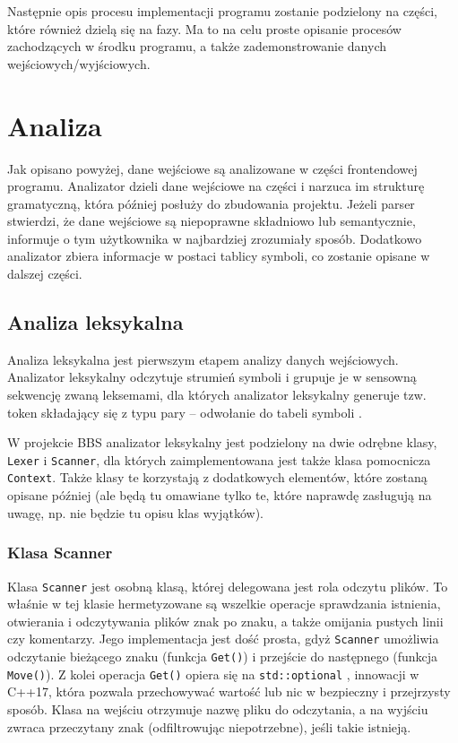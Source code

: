Następnie opis procesu implementacji programu zostanie podzielony na części, które również dzielą się na fazy. Ma to na celu proste opisanie procesów zachodzących w środku programu, a także zademonstrowanie danych wejściowych/wyjściowych.

\section{Analiza}
Jak opisano powyżej, dane wejściowe są analizowane w części frontendowej programu. Analizator dzieli dane wejściowe na części i narzuca im strukturę gramatyczną, która później posłuży do zbudowania projektu. Jeżeli parser stwierdzi, że dane wejściowe są niepoprawne składniowo lub semantycznie, informuje o tym użytkownika w najbardziej zrozumiały sposób. Dodatkowo analizator zbiera informacje w postaci tablicy symboli, co zostanie opisane w dalszej części.

\subsection{Analiza leksykalna}
Analiza leksykalna jest pierwszym etapem analizy danych wejściowych. Analizator leksykalny odczytuje strumień symboli i grupuje je w sensowną sekwencję zwaną leksemami, dla których analizator leksykalny generuje tzw. token składający się z typu pary -- odwołanie do tabeli symboli \cite{compilers}.

W projekcie BBS analizator leksykalny jest podzielony na dwie odrębne klasy, \texttt{Lexer} i \texttt{Scanner}, dla których zaimplementowana jest także klasa pomocnicza \texttt{Context}. Także klasy te korzystają z dodatkowych elementów, które zostaną opisane później (ale będą tu omawiane tylko te, które naprawdę zasługują na uwagę, np. nie będzie tu opisu klas wyjątków).

\subsubsection{Klasa Scanner}
Klasa \texttt{Scanner} jest osobną klasą, której delegowana jest rola odczytu plików. To właśnie w tej klasie hermetyzowane są wszelkie operacje sprawdzania istnienia, otwierania i odczytywania plików znak po znaku, a także omijania pustych linii czy komentarzy. Jego implementacja jest dość prosta, gdyż \texttt{Scanner} umożliwia odczytanie bieżącego znaku (funkcja \texttt{Get()}) i przejście do następnego (funkcja \texttt{Move()}). Z kolei operacja \texttt{Get()} opiera się na \texttt{std::optional} \cite{cpp_optional}, innowacji w C++17, która pozwala przechowywać wartość lub nic w bezpieczny i przejrzysty sposób. Klasa na wejściu otrzymuje nazwę pliku do odczytania, a na wyjściu zwraca przeczytany znak (odfiltrowując niepotrzebne), jeśli takie istnieją.

